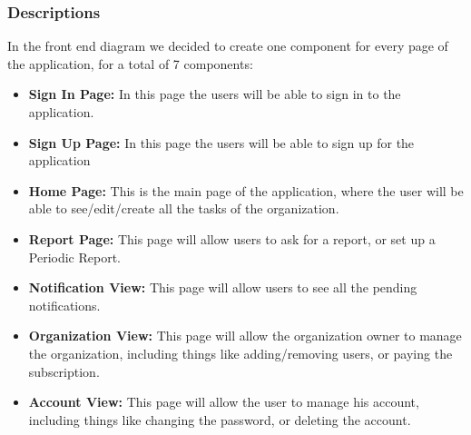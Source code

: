 \documentclass{article}
\begin{document}
\subsubsection{Descriptions}
In the front end diagram we decided to create one component for every page of the application, for a total of 7 components:
\begin{itemize}
    \item \textbf{Sign In Page: } In this page the users will be able to sign in to the application.
    \item \textbf{Sign Up Page: } In this page the users will be able to sign up for the application
    \item \textbf{Home Page: } This is the main page of the application, where the user will be able to see/edit/create all the tasks of the organization.
    \item \textbf{Report Page: } This page will allow users to ask for a report, or set up a Periodic Report.
    \item \textbf{Notification View: } This page will allow users to see all the pending notifications.
    \item \textbf{Organization View: } This page will allow the organization owner to manage the organization, including things like adding/removing users, or paying the subscription.
    \item \textbf{Account View: } This page will allow the user to manage his account, including things like changing the password, or deleting the account.
\end{itemize}
\end{document}
